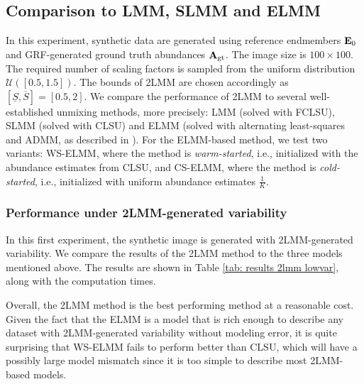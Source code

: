 

\subsection{Comparison to LMM, SLMM and ELMM}

In this experiment, synthetic data are generated using reference endmembers $\mathbf{E}_0$ and GRF-generated ground truth abundances $\mathbf{A}_\mathrm{gt}$. The image size is $100 \times 100$. The required number of scaling factors is sampled from the uniform distribution $\mathcal{U}([0.5, 1.5])$.
The bounds of 2LMM are chosen accordingly as $[\underline{S}, \overline{S}] = [0.5, 2]$.
We compare the performance of 2LMM to several well-established unmixing methods, more precisely: LMM (solved with FCLSU), SLMM (solved with CLSU) and ELMM (solved with alternating least-squares and ADMM, as described in \cite{drumetz_blind_2016}).
For the ELMM-based method, we test two variants: WS-ELMM, where the method is \textit{warm-started}, i.e., initialized with the abundance estimates from CLSU, and CS-ELMM, where the method is \textit{cold-started}, i.e., initialized with uniform abundance estimates $\frac{1}{K}$. 

\subsubsection{Performance under 2LMM-generated variability}
In this first experiment, the synthetic image is generated with 2LMM-generated variability. We compare the results of the 2LMM method to the three models mentioned above.  The results are shown in Table \ref{tab: results 2lmm lowvar}, along with the computation times. 

Overall, the 2LMM method is the best performing method at a reasonable cost. Given the fact that the ELMM is a model that is rich enough to describe any dataset with 2LMM-generated variability without modeling error, it is quite surprising that WS-ELMM fails to perform better than CLSU, which will have a possibly large model mismatch since it is too simple to describe most 2LMM-based models.

